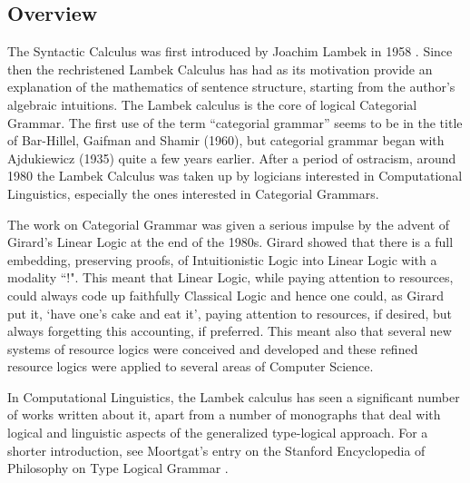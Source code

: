 \documentclass{article}
\begin{document}
\subsection*{Overview}
The Syntactic Calculus was first introduced by Joachim Lambek in 1958 \cite{Lambek1958}. Since then the  rechristened  Lambek Calculus has had as its motivation provide an explanation of the mathematics of sentence
structure, starting from the author's algebraic intuitions. The Lambek
calculus is the core of logical Categorial Grammar.  The first use of
the term “categorial grammar” seems to be in the title of Bar-Hillel,
Gaifman and Shamir (1960), but categorial grammar began with
Ajdukiewicz (1935) quite a few years earlier. After a period of
ostracism, around 1980 the Lambek Calculus was taken up by logicians
interested in Computational Linguistics, especially the ones
interested in Categorial Grammars. %

The work on Categorial Grammar was given a serious impulse by the
advent of Girard's Linear Logic  at the end of the 1980s.  Girard \cite{Girard:1987}
showed that there is a full embedding, preserving proofs, of
Intuitionistic Logic into Linear Logic with a modality ``!". This
meant that Linear Logic, while paying attention to resources, could
always code up faithfully Classical Logic and hence one could, as
Girard put it, `have one's cake and eat it', paying attention to
resources, if desired, but always forgetting this accounting, if
preferred. This meant also that several new
systems of resource logics were conceived and developed and these
refined resource logics were applied to several areas of Computer
Science.

In Computational Linguistics, the Lambek calculus 
has seen a significant number of works written
about it,  apart from a number of monographs that deal with
logical and linguistic aspects of the generalized type-logical
approach.  
For a shorter introduction, see Moortgat's entry on the Stanford Encyclopedia of Philosophy  on Type Logical Grammar \cite{MoortgatSEP}.
\end{document}
